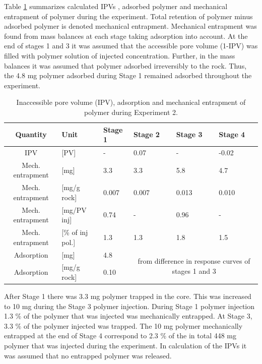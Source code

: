 Table \ref{tab:ipvexp2} summarizes calculated IPVs , adsorbed polymer and mechanical entrapment of polymer during the experiment. Total retention of polymer minus adsorbed polymer is denoted mechanical entrapment. Mechanical entrapment was found from mass balances at each stage taking adsorption into account. At the end of stages 1 and 3 it was assumed that the accessible pore volume (1-IPV) was filled with polymer solution of injected concentration. Further, in the mass balances it was assumed that polymer adsorbed irreversibly to the rock. Thus, the 4.8 mg polymer adsorbed during Stage 1 remained adsorbed throughout the experiment.

\begin{table} 
\small
\centering
\caption{Inaccessible pore volume (IPV), adsorption and mechanical entrapment of polymer during Experiment 2.}
\label{tab:ipvexp2}
\begin{tabular}{c l l l l l } 
\toprule
\textbf{Quantity} & \textbf{Unit} & \textbf{Stage 1} & \textbf{Stage 2} & \textbf{Stage 3} & \textbf{Stage 4} \\ 
\midrule 
IPV                & [PV]           & -         & 0.07     & -         & -0.02     \\
Mech. entrapment   & [mg]          & 3.3       & 3.3       & 5.8       & 4.7       \\ 
Mech. entrapment   & [mg/g rock]   & 0.007     & 0.007     & 0.013     & 0.010     \\ 
Mech. entrapment   & [mg/PV inj]   & 0.74      & -         & 0.96      & -         \\
Mech. entrapment   & [\% of inj pol.]& 1.3       & 1.3       & 1.8       & 1.5       \\ 
Adsorption         & [mg]          & 4.8       &   \multicolumn{3}{c}{\multirow{2}{15em}{from difference in response curves of stages 1 and 3}}        \\
Adsorption         & [mg/g rock]   & 0.10      &  \multicolumn{3}{c}{}    \\ 
\bottomrule
\end{tabular}
\end{table}

After Stage 1 there was 3.3 mg polymer trapped in the core. This was increased to 10 mg during the Stage 3 polymer injection. During Stage 1 polymer injection 1.3 \% of the polymer that was injected was mechanically entrapped. At Stage 3, 3.3 \% of the polymer injected was trapped. The 10 mg polymer mechanically entrapped at the end of Stage 4 correspond to 2.3 \% of the in total 448 mg polymer that was injected during the experiment. In calculation of the IPVs it was assumed that no entrapped polymer was released.

